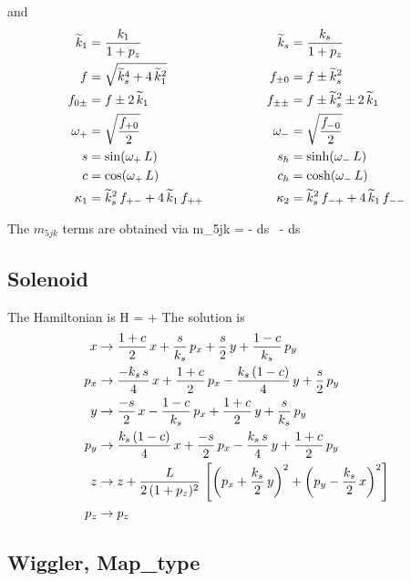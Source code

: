 \documentclass{book}
\begin{document}
and
\begin{alignat}{2}
  \widetilde k_1      &= \frac{k_1}{1 + p_z} & \qquad \qquad 
  \widetilde k_s        &= \frac{k_s}{1 + p_z} \nonumber \\
  f          &= \sqrt{\widetilde k_s^4 + 4 \, \widetilde k_1^2} & \qquad \qquad
  f_{\pm0}   &= f \pm \widetilde k_s^2 \nonumber \\
  f_{0\pm}   &= f \pm 2 \, \widetilde k_1 & \qquad \qquad
  f_{\pm\pm} &= f \pm \widetilde k_s^2 \pm 2 \, \widetilde k_1 \nonumber \\
  \omega_+      &= \sqrt{\frac{f_{+0}}{2}} & \qquad \qquad
  \omega_-      &= \sqrt{\frac{f_{-0}}{2}} \\
  s          &= \sin (\omega_+ \, L) & \qquad \qquad
  s_h        &= \sinh (\omega_- \, L) \nonumber \\
  c          &= \cos (\omega_+ \, L) & \qquad \qquad
  c_h        &= \cosh (\omega_- \, L) \nonumber \\
  \kappa_1   &= \widetilde k_s^2 \, f_{+-} + 4 \, \widetilde k_1 \, f_{++} & \qquad \qquad
  \kappa_2   &= \widetilde k_s^2 \, f_{-+} + 4 \, \widetilde k_1 \, f_{--} \nonumber
\end{alignat}

The $m_{5jk}$ terms are obtained via 
\Begineq
  m_{5jk} = -  \int \! ds \, 
  \left[ (p_x - a_x)^2 + (p_y - a_y)^2 \right] - \int \! ds \,
\Endeq

\subsection{Solenoid}

The Hamiltonian is
\Begineq
  H =  + 
\Endeq
The solution is
\begin{align}
  x   &\rightarrow \frac{1 + c}{2} \, x + \frac{s}{k_s} \, p_x +
           \frac{s}{2} \, y + \frac{1 - c}{k_s} \, p_y \nonumber \\
  p_x &\rightarrow \frac{-k_s \, s}{4} \, x + \frac{1 + c}{2} \, p_x - 
           \frac{k_s \, (1 - c)}{4} \, y + \frac{s}{2} \, p_y \nonumber \\
  y   &\rightarrow \frac{-s}{2} \, x - \frac{1 - c}{k_s} \, p_x +
           \frac{1 + c}{2} \, y + \frac{s}{k_s} \, p_y \\      
  p_y &\rightarrow \frac{k_s \, (1 - c)}{4} \, x + \frac{-s}{2} \, p_x -
            \frac{k_s \, s}{4} \, y + \frac{1 + c}{2} \, p_y \nonumber \\ 
  z   &\rightarrow z + \frac{L}{2 \, (1 + p_z)^2} \, 
                   \left[ \left( p_x + \frac{k_s}{2} \, y \right)^2 +
                          \left( p_y - \frac{k_s}{2} \, x \right)^2 \right] \nonumber \\
  p_z &\rightarrow p_z \nonumber
\end{align}

\subsection{Wiggler, Map\_type}
\end{document}
